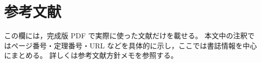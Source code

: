 \notepagelinks{}{}
\chapter*{参考文献}
\label{sec:references}

この欄には，完成版 PDF で実際に使った文献だけを載せる。
本文中の注釈ではページ番号・定理番号・URL などを具体的に示し，ここでは書誌情報を中心にまとめる。
詳しくは参考文献方針メモを参照する。

